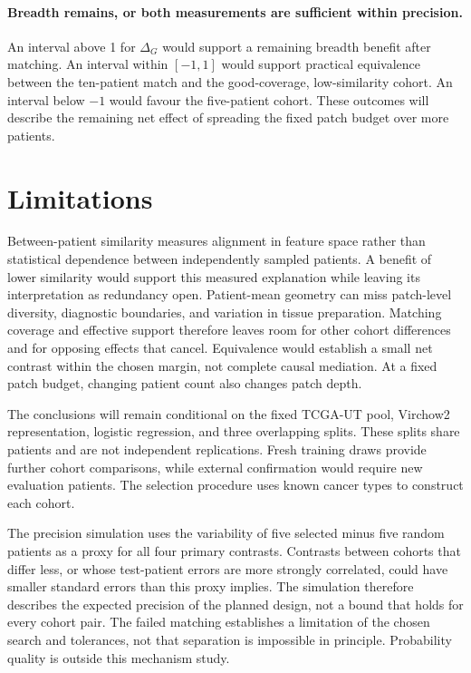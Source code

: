 \documentclass[11pt]{article}
\begin{document}
\paragraph{Breadth remains, or both measurements are sufficient within precision.}
An interval above 1 for $\Delta_G$ would support a remaining breadth benefit after matching. An interval within $[-1,1]$ would support practical equivalence between the ten-patient match and the good-coverage, low-similarity cohort. An interval below $-1$ would favour the five-patient cohort. These outcomes will describe the remaining net effect of spreading the fixed patch budget over more patients.



\section{Limitations}
\label{sec:limitations}
Between-patient similarity measures alignment in feature space rather than statistical dependence between independently sampled patients. A benefit of lower similarity would support this measured explanation while leaving its interpretation as redundancy open. Patient-mean geometry can miss patch-level diversity, diagnostic boundaries, and variation in tissue preparation. Matching coverage and effective support therefore leaves room for other cohort differences and for opposing effects that cancel. Equivalence would establish a small net contrast within the chosen margin, not complete causal mediation. At a fixed patch budget, changing patient count also changes patch depth.

The conclusions will remain conditional on the fixed TCGA-UT pool, Virchow2 representation, logistic regression, and three overlapping splits. These splits share patients and are not independent replications. Fresh training draws provide further cohort comparisons, while external confirmation would require new evaluation patients. The selection procedure uses known cancer types to construct each cohort.

The precision simulation uses the variability of five selected minus five random patients as a proxy for all four primary contrasts. Contrasts between cohorts that differ less, or whose test-patient errors are more strongly correlated, could have smaller standard errors than this proxy implies. The simulation therefore describes the expected precision of the planned design, not a bound that holds for every cohort pair. The failed matching establishes a limitation of the chosen search and tolerances, not that separation is impossible in principle. Probability quality is outside this mechanism study.
\end{document}
